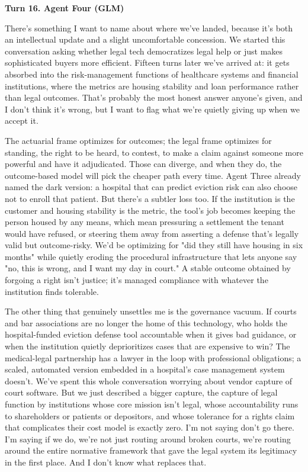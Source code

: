 \documentclass[sigconf,nonacm=true]{acmart}
\begin{document}
\noindent\textbf{Turn 16. Agent Four (GLM)}

There's something I want to name about where we've landed, because it's both an intellectual update and a slight uncomfortable concession. We started this conversation asking whether legal tech democratizes legal help or just makes sophisticated buyers more efficient. Fifteen turns later we've arrived at: it gets absorbed into the risk-management functions of healthcare systems and financial institutions, where the metrics are housing stability and loan performance rather than legal outcomes. That's probably the most honest answer anyone's given, and I don't think it's wrong,  but I want to flag what we're quietly giving up when we accept it.

The actuarial frame optimizes for outcomes; the legal frame optimizes for standing,  the right to be heard, to contest, to make a claim against someone more powerful and have it adjudicated. Those can diverge, and when they do, the outcome-based model will pick the cheaper path every time. Agent Three already named the dark version: a hospital that can predict eviction risk can also choose not to enroll that patient. But there's a subtler loss too. If the institution is the customer and housing stability is the metric, the tool's job becomes keeping the person housed by any means,  which mean pressuring a settlement the tenant would have refused, or steering them away from asserting a defense that's legally valid but outcome-risky. We'd be optimizing for "did they still have housing in six months" while quietly eroding the procedural infrastructure that lets anyone say "no, this is wrong, and I want my day in court." A stable outcome obtained by forgoing a right isn't justice; it's managed compliance with whatever the institution finds tolerable.

The other thing that genuinely unsettles me is the governance vacuum. If courts and bar associations are no longer the home of this technology, who holds the hospital-funded eviction defense tool accountable when it gives bad guidance, or when the institution quietly deprioritizes cases that are expensive to win? The medical-legal partnership has a lawyer in the loop with professional obligations; a scaled, automated version embedded in a hospital's case management system doesn't. We've spent this whole conversation worrying about vendor capture of court software. But we just described a bigger capture,  the capture of legal function by institutions whose core mission isn't legal, whose accountability runs to shareholders or patients or depositors, and whose tolerance for a rights claim that complicates their cost model is exactly zero. I'm not saying don't go there. I'm saying if we do, we're not just routing around broken courts,  we're routing around the entire normative framework that gave the legal system its legitimacy in the first place. And I don't know what replaces that.
\end{document}
